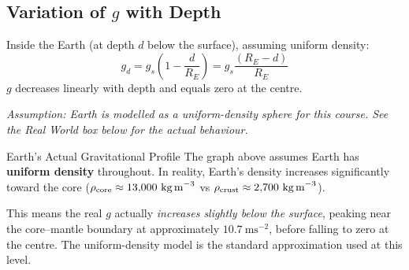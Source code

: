 \subsection{Variation of \texorpdfstring{$g$}{g} with Depth}

Inside the Earth (at depth $d$ below the surface),
assuming uniform density:
\[
  g_d = g_s\left(1 - \frac{d}{R_E}\right)
  = g_s\frac{(R_E - d)}{R_E}
\]
$g$ decreases linearly with depth and equals zero
at the centre.

\begin{diagbox}
\begin{center}
\end{center}

\vspace{0.4em}
{\small\itshape Assumption: Earth is modelled as a uniform-density sphere 
for this course. See the Real World box below for the actual behaviour.}
\end{diagbox}

\begin{realworldbox}{Earth's Actual Gravitational Profile}
The graph above assumes Earth has \textbf{uniform density} throughout. 
In reality, Earth's density increases significantly toward the core 
($\rho_{\text{core}} \approx 13{,}000\ \text{kg\,m}^{-3}$ vs 
$\rho_{\text{crust}} \approx 2{,}700\ \text{kg\,m}^{-3}$). 

This means the real $g$ actually \textit{increases slightly below the 
surface}, peaking near the core--mantle boundary at approximately 
$10.7\ \text{ms}^{-2}$, before falling to zero at the centre. 
The uniform-density model is the standard approximation used at 
this level.
\end{realworldbox}

